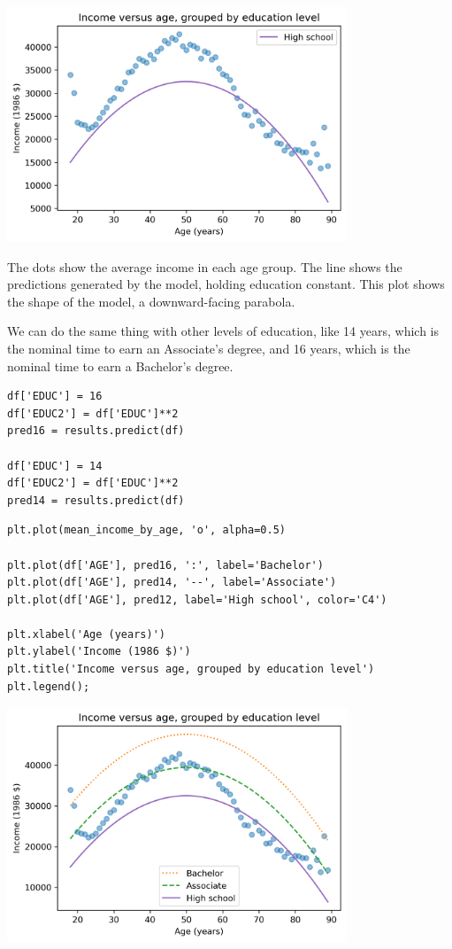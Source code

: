 \begin{center}
\includegraphics[width=4in]{chapters/10_regression_files/10_regression_53_0.png}
\end{center}

The dots show the average income in each age group. The line shows the
predictions generated by the model, holding education constant. This
plot shows the shape of the model, a downward-facing parabola.

We can do the same thing with other levels of education, like 14 years,
which is the nominal time to earn an Associate's degree, and 16 years,
which is the nominal time to earn a Bachelor's degree.

\begin{lstlisting}[]
df['EDUC'] = 16
df['EDUC2'] = df['EDUC']**2
pred16 = results.predict(df)

df['EDUC'] = 14
df['EDUC2'] = df['EDUC']**2
pred14 = results.predict(df)
\end{lstlisting}

\begin{lstlisting}[]
plt.plot(mean_income_by_age, 'o', alpha=0.5)

plt.plot(df['AGE'], pred16, ':', label='Bachelor')
plt.plot(df['AGE'], pred14, '--', label='Associate')
plt.plot(df['AGE'], pred12, label='High school', color='C4')

plt.xlabel('Age (years)')
plt.ylabel('Income (1986 $)')
plt.title('Income versus age, grouped by education level')
plt.legend();
\end{lstlisting}

\begin{center}
\includegraphics[width=4in]{chapters/10_regression_files/10_regression_56_0.png}
\end{center}

